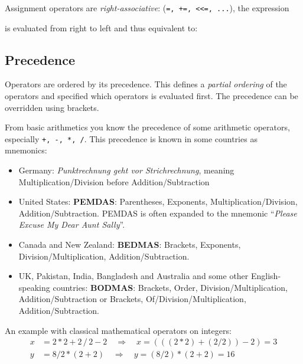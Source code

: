 \begin{example}
  Assignment operators are \emph{right-associative}:  (\texttt{=, +=, <<=, ...}), \ie the expression

 is evaluated from right to left and thus equivalent to: 
\end{example}

\subsection{Precedence\label{sec:operator-precedence}}
Operators are ordered by its precedence. This defines a \emph{partial ordering} of the operators and specified which operators is evaluated first.
The precedence can be overridden using brackets.

From basic arithmetics you know the precedence of some arithmetic operators, especially \texttt{+, -, *, /}. This precedence is known in some countries as mnemonics:
\begin{itemize}
  \item Germany: \textit{Punktrechnung geht vor Strichrechnung}, meaning Multiplication/Division before Addition/Subtraction
  \item United States: \textbf{PEMDAS}: Parentheses, Exponents, Multiplication/Division, Addition/Subtraction. PEMDAS is often expanded to the mnemonic ``\textit{Please Excuse My Dear Aunt Sally}''.
  \item Canada and New Zealand: \textbf{BEDMAS}: Brackets, Exponents, Division/Multiplication, Addition/Subtraction.
  \item UK, Pakistan, India, Bangladesh and Australia and some other English-speaking countries: \textbf{BODMAS}: Brackets, Order, Division/Multiplication, Addition/Subtraction or Brackets, Of/Division/Multiplication, Addition/Subtraction.
\end{itemize}

\begin{example}
  An example with classical mathematical operators on integers:
\[\begin{split}
  x &= 2 * 2 + 2\, /\, 2 - 2\quad\Rightarrow\quad x = \left(\left(\left(2 * 2\right) + \left(2 / 2\right)\right) - 2\right) = 3 \\
  y &= 8 / 2 * (2 + 2)\quad\Rightarrow\quad y = (8 / 2) * (2 + 2) = 16
\end{split}\]
\end{example}

